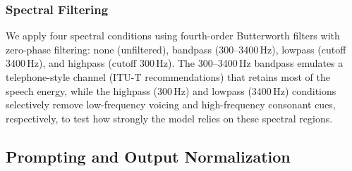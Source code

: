 \documentclass[11pt,a4paper]{article}
\begin{document}
\subsubsection{Spectral Filtering}
\label{subsubsec:filtering}

We apply four spectral conditions using fourth-order Butterworth filters with zero-phase filtering: none (unfiltered), bandpass (300--3400\,Hz), lowpass (cutoff 3400\,Hz), and highpass (cutoff 300\,Hz). The 300--3400\,Hz bandpass emulates a telephone-style channel (ITU-T recommendations) that retains most of the speech energy, while the highpass (300\,Hz) and lowpass (3400\,Hz) conditions selectively remove low-frequency voicing and high-frequency consonant cues, respectively, to test how strongly the model relies on these spectral regions.

\subsection{Prompting and Output Normalization}
\label{subsec:prompting}
\end{document}
